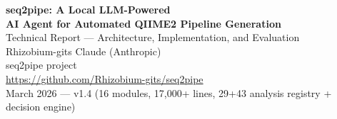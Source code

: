 \documentclass[12pt, a4paper]{article}
\begin{document}
\begin{center}
  {\LARGE \textbf{seq2pipe: A Local LLM-Powered}}\\[4pt]
  {\LARGE \textbf{AI Agent for Automated QIIME2 Pipeline Generation}}\\[8pt]
  {\normalsize Technical Report --- Architecture, Implementation, and Evaluation}\\[12pt]
  {\normalsize Rhizobium-gits \quad Claude (Anthropic)}\\[4pt]
  {\small seq2pipe project}\\[2pt]
  {\small \url{https://github.com/Rhizobium-gits/seq2pipe}}\\[8pt]
  {\small March 2026 --- v1.4 (16 modules, 17,000+ lines, 29+43 analysis registry + decision engine)}
\end{center}

\vspace{6mm}
\end{document}
